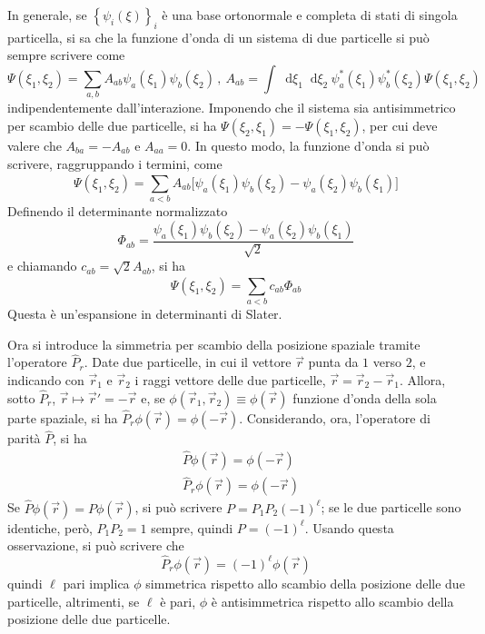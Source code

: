 \documentclass[11pt, a4paper]{scrartcl}
\theoremstyle{style}
\newenvironment{boxenv}[1][]{
    \begin{eqbox}[#1]
    }{
   \end{eqbox}
}
\newcommand{\dd}{\mathop{}\!\mathrm{d}}
\numberwithin{equation}{subsection}
\begin{document}
\begin{boxenv}[]
In generale, se $\left\{ \psi _i(\xi ) \right\}_i$ \`e una base ortonormale e completa di stati di singola particella, si sa che la funzione d'onda di un sistema di due particelle si pu\`o sempre scrivere come 
\[
\Psi (\xi _1,\xi _2) = \sum_{a,b}^{} A_{ab} \psi _a (\xi _1) \psi _b(\xi _2) \, , \  A_{ab} = \int \dd \xi _1 \dd \xi _2 \ \psi _a^*(\xi _1) \psi _b^*(\xi _2)\Psi(\xi _1,\xi _2)
\] 
indipendentemente dall'interazione.
Imponendo che il sistema sia antisimmetrico per scambio delle due particelle, si ha $\Psi(\xi _2,\xi _1) = - \Psi(\xi _1,\xi _2)$, per cui deve valere che $A_{ba} = - A_{ab}$ e $A_{aa}= 0$.
In questo modo, la funzione d'onda si pu\`o scrivere, raggruppando i termini, come
\[
	\Psi(\xi _1,\xi _2) = \sum_{a<b}^{} A_{ab} \big[\psi _a(\xi _1) \psi _b(\xi _2) - \psi _a(\xi _2) \psi _b(\xi _1)\big]
\] 
Definendo il determinante normalizzato
\[
\Phi _{ab} = \frac{\psi _a(\xi _1) \psi _b(\xi _2) - \psi _a(\xi _2) \psi _b(\xi _1) }{\sqrt{2} }
\] 
e chiamando $c_{ab} = \sqrt{2} A_{ab}$, si ha 
\begin{equation}
	\Psi(\xi _1,\xi _2) = \sum_{a<b}^{} c_{ab} \Phi_{ab}
\end{equation}
Questa \`e un'espansione in determinanti di Slater.
\end{boxenv}

\noindent Ora si introduce la simmetria per scambio della posizione spaziale tramite l'operatore $\hat{P}_r$.
Date due particelle, in cui il vettore $\vec{r}$ punta da $1$ verso $2$, e indicando con $\vec{r}_1$ e $\vec{r}_2$ i raggi vettore delle due particelle, $\vec{r} = \vec{r}_2 - \vec{r}_1$.
Allora, sotto $\hat{P}_r$, $\vec{r}\mapsto \vec{r}' = - \vec{r}$ e, se $\phi (\vec{r}_1, \vec{r}_2) \equiv \phi (\vec{r})$ funzione d'onda della sola parte spaziale, si ha $\hat{P}_r \phi (\vec{r}) = \phi (-\vec{r})$.
Considerando, ora, l'operatore di parit\`a $\hat{P}$, si ha 
\[
	\begin{split}
		&\hat{P} \phi (\vec{r}) = \phi (-\vec{r}) \\
		& \hat{P}_r \phi (\vec{r}) = \phi (-\vec{r})
	\end{split}
\] 
Se $\hat{P} \phi (\vec{r}) = P \phi (\vec{r})$, si pu\`o scrivere $P = P_1P_2 (-1)^\ell $; se le due particelle sono identiche, per\`o, $P_1P_2=1$ sempre, quindi $P = (-1)^\ell $.
Usando questa osservazione, si pu\`o scrivere che
\[
\hat{P}_r \phi (\vec{r}) = (-1)^\ell  \phi (\vec{r})
\] 
quindi $\ell $ pari implica $\phi $ simmetrica rispetto allo scambio della posizione delle due particelle, altrimenti, se $\ell $ \`e pari, $\phi $ \`e antisimmetrica rispetto allo scambio della posizione delle due particelle.
\end{document}
